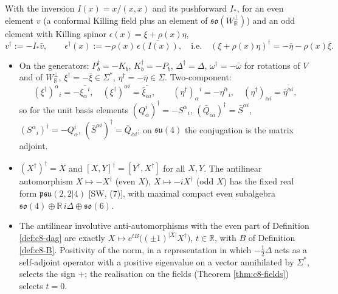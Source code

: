 \begin{definition}
\label{def:c8-dag}
With the inversion $I(x)=x/(x,x)$ and its pushforward $I_*$, for an even element $v$ (a conformal Killing field plus an element of $\mathfrak{so}(W_{\mathbb R}^\perp)$) and an odd element with Killing spinor $\epsilon(x)=\xi+\rho(x)\eta$,
\[
v^\dagger:=-I_*\bar v,\qquad \epsilon^\dagger(x):=-\rho(x)\,\overline{\epsilon(I(x))},\quad\text{i.e.}\quad (\xi+\rho(x)\eta)^\dagger=-\overline\eta-\rho(x)\overline\xi .
\]
\end{definition}

\begin{theorem}
\label{thm:c8-dag}
\begin{itemize}
\item[(i)] On the generators: $P_b^\dagger=-K_{\bar b}$, $K_b^\dagger=-P_{\bar b}$, $\Delta^\dagger=\Delta$, $\omega^\dagger=-\bar\omega$ for rotations of $V$ and of $W_{\mathbb R}^\perp$, $\xi^\dagger=-\overline\xi\in\Sigma^*$, $\eta^\dagger=-\overline\eta\in\Sigma$. Two-component:
\[
(\xi^\dagger)^\alpha{}_i=-\overline{\xi_\alpha{}^i},\quad (\xi^\dagger)^{\dot\alpha i}=\overline{\bar\xi_{\dot\alpha i}},\qquad (\eta^\dagger)_\alpha{}^i=-\overline{\eta^\alpha{}_i},\quad (\eta^\dagger)_{\dot\alpha i}=\overline{\bar\eta^{\dot\alpha i}},
\]
so for the unit basis elements $(Q^i_\alpha)^\dagger=-S^\alpha{}_i$, $(\bar Q_{\dot\alpha i})^\dagger=\bar S^{\dot\alpha i}$, $(S^\alpha{}_i)^\dagger=-Q^i_\alpha$, $(\bar S^{\dot\alpha i})^\dagger=\bar Q_{\dot\alpha i}$; on $\mathfrak{su}(4)$ the conjugation is the matrix adjoint.
\item[(ii)] $(X^\dagger)^\dagger=X$ and $[X,Y]^\dagger=[Y^\dagger,X^\dagger]$ for all $X,Y$. The antilinear automorphism $X\mapsto-X^\dagger$ (even $X$), $X\mapsto-iX^\dagger$ (odd $X$) has the fixed real form $\mathfrak{psu}(2,2|4)$ [SW, (7)], with maximal compact even subalgebra $\mathfrak{so}(4)\oplus\mathbb R\,i\Delta\oplus\mathfrak{so}(6)$.
\item[(iii)] The antilinear involutive anti-automorphisms with the even part of Definition \ref{def:c8-dag} are exactly $X\mapsto e^{tB}\big((\pm1)^{|X|}X^\dagger\big)$, $t\in\mathbb R$, with $B$ of Definition \ref{def:c8-B}. Positivity of the norm, in a representation in which $-\tfrac12\Delta$ acts as a self-adjoint operator with a positive eigenvalue on a vector annihilated by $\Sigma^*$, selects the sign $+$; the realisation on the fields (Theorem \ref{thm:c8-fields}) selects $t=0$.
\end{itemize}
\end{theorem}

